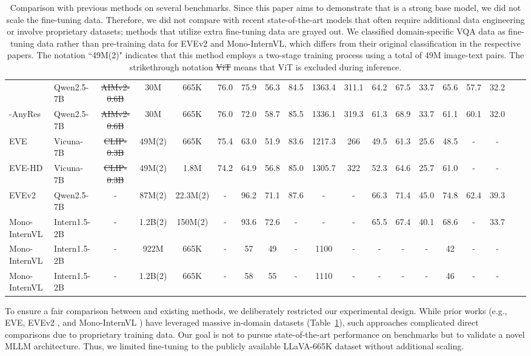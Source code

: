 \begin{table}[h]
\begin{tabular}{llccccccccccccccccc}
        \model{} & Qwen2.5-7B & \sout{AIMv2-0.6B} & 30M & 665K & 76.0 & 75.9 & 56.3 & 84.5 & 1363.4 & 311.1 & 64.2 & 67.5 & 33.7 & 65.6 & 57.7 & 32.2\\
       \model{}-AnyRes & Qwen2.5-7B & \sout{AIMv2-0.6B} & 30M & 665K & 76.0 & 72.0 & 58.7 & 85.5 & 1336.1 & 319.3 & 61.3 & 68.9 & 33.7 & 61.1 & 60.1 & 32.0\\
       EVE \cite{eve} & Vicuna-7B & \sout{CLIP-0.3B} & 49M(2) & 665K & 75.4 & 63.0 & 51.9 & 83.6 & 1217.3 & 266 & 49.5 & 61.3 & 25.6 & 48.5 & - & - \\
   \rowcolor{gray!30} 
      EVE-HD \cite{eve} & Vicuna-7B & \sout{CLIP-0.3B} & 49M(2) & 1.8M & 74.2 & 64.9 & 56.8 & 85.0 & 1305.7 & 322 & 52.3 & 64.6 & 25.7 & 61.0 & - & - \\
    \rowcolor{gray!30}  
      EVEv2 \cite{evev2} & Qwen2.5-7B & - & 87M(2) & 22.3M(2) & - & 96.2 & 71.1 & 87.6 & - & - & 66.3 & 71.4 & 45.0 & 74.8 & 62.4 & 39.3 \\
  \rowcolor{gray!30}  
      Mono-InternVL \cite{monointernvl} & Intern1.5-2B & - & 1.2B(2) & 150M(2) & - & 93.6 & 72.6 & - & - & - & 65.5 & 67.4 & 40.1 & 68.6 & - & 33.7 \\
      Mono-InternVL \cite{monointernvl} & Intern1.5-2B & - & 922M & 665K & - & 57 & 49 & - & 1100 & - & - & - & - & 42 & - & - \\
    Mono-InternVL \cite{monointernvl} & Intern1.5-2B & - & 1.2B(2) & 665K & - & 58 & 55 & - & 1110 & - & - & - & - & 46 & - & - \\
        \bottomrule
    \end{tabular}
    \caption{Comparison with previous methods on several benchmarks. Since this paper aims to demonstrate that \model{} is a strong base model, we did not scale the fine-tuning data. Therefore, we did not compare with recent state-of-the-art models that often require additional data engineering or involve proprietary datasets; methods that utilize extra fine-tuning data are grayed out. We classified domain-specific VQA data as fine-tuning data rather than pre-training data for EVEv2 and Mono-InternVL, which differs from their original classification in the respective papers. The notation ``49M(2)" indicates that this method employs a two-stage training process using a total of 49M image-text pairs. The strikethrough notation \sout{ViT} means that ViT is excluded during inference.}
    \label{tab:mlm_comparison}
\end{table}
To ensure a fair comparison between \model{} and existing methods, we deliberately restricted our experimental design. While prior works (e.g., EVE, EVEv2 \cite{evev2}, and Mono-InternVL \cite{monointernvl}) have leveraged massive in-domain datasets (Table~\ref{tab:mlm_comparison}), such approaches complicated direct comparisons due to proprietary training data. Our goal is not to pursue state-of-the-art performance on benchmarks but to validate a novel MLLM architecture. Thus, we limited fine-tuning to the publicly available LLaVA-665K dataset without additional scaling.

